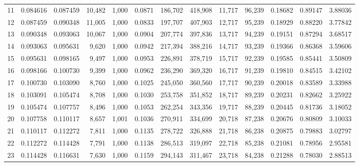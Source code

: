 \begin{tabular}{rrrrrrrrrrrrr}
11  &  0.084616 &  0.087459 &  10,482 &  1,000 &                                     0.0871 &  186,702 &  418,908 &   11,717 &   96,239 &  0.18682 &  0.89147 &  3.88036 \\
12  &  0.087459 &  0.090348 &  11,005 &  1,000 &                                     0.0833 &  197,707 &  407,903 &   12,717 &   95,239 &  0.18929 &  0.88220 &  3.77842 \\
13  &  0.090348 &  0.093063 &  10,067 &  1,000 &                                     0.0904 &  207,774 &  397,836 &   13,717 &   94,239 &  0.19151 &  0.87294 &  3.68517 \\
14  &  0.093063 &  0.095631 &   9,620 &  1,000 &                                     0.0942 &  217,394 &  388,216 &   14,717 &   93,239 &  0.19366 &  0.86368 &  3.59606 \\
15  &  0.095631 &  0.098165 &   9,497 &  1,000 &                                     0.0953 &  226,891 &  378,719 &   15,717 &   92,239 &  0.19585 &  0.85441 &  3.50809 \\
16  &  0.098166 &  0.100730 &   9,399 &  1,000 &                                     0.0962 &  236,290 &  369,320 &   16,717 &   91,239 &  0.19810 &  0.84515 &  3.42102 \\
17  &  0.100730 &  0.103090 &   8,760 &  1,000 &                                     0.1025 &  245,050 &  360,560 &   17,717 &   90,239 &  0.20018 &  0.83589 &  3.33988 \\
18  &  0.103091 &  0.105474 &   8,708 &  1,000 &                                     0.1030 &  253,758 &  351,852 &   18,717 &   89,239 &  0.20231 &  0.82662 &  3.25922 \\
19  &  0.105474 &  0.107757 &   8,496 &  1,000 &                                     0.1053 &  262,254 &  343,356 &   19,717 &   88,239 &  0.20445 &  0.81736 &  3.18052 \\
20  &  0.107758 &  0.110117 &   8,657 &  1,001 &                                     0.1036 &  270,911 &  334,699 &   20,718 &   87,238 &  0.20676 &  0.80809 &  3.10033 \\
21  &  0.110117 &  0.112272 &   7,811 &  1,000 &                                     0.1135 &  278,722 &  326,888 &   21,718 &   86,238 &  0.20875 &  0.79883 &  3.02797 \\
22  &  0.112272 &  0.114428 &   7,791 &  1,000 &                                     0.1138 &  286,513 &  319,097 &   22,718 &   85,238 &  0.21081 &  0.78956 &  2.95581 \\
23  &  0.114428 &  0.116631 &   7,630 &  1,000 &                                     0.1159 &  294,143 &  311,467 &   23,718 &   84,238 &  0.21288 &  0.78030 &  2.88513 \\

\end{tabular}
